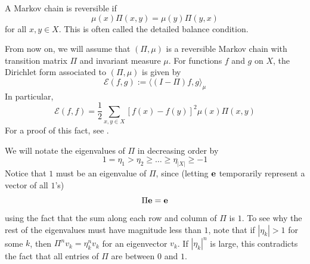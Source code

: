 \documentclass[12pt]{report}
\theoremstyle{definition}
\begin{document}
A Markov chain is reversible if 
$$
\mu(x)\Pi(x,y)=\mu(y)\Pi(y,x)$$ for all $x,y\in X$.  This is often called the detailed balance condition.  

From now on, we will assume that $(\Pi, \mu)$ is a reversible Markov chain with transition matrix $\Pi$ and invariant measure $\mu$.  For functions $f$ and $g$ on $X$, the Dirichlet form associated to $(\Pi,\mu)$ is given by 
$$
\mathcal{E}(f,g):=\langle (I-\Pi)f,g\rangle_{\mu}
$$
In particular, 
$$
\mathcal{E}(f,f)=\frac{1}{2}\sum_{x,y\in X}[f(x)-f(y)]^2\mu(x)\Pi(x,y)
$$
For a proof of this fact, see \cite{LPW}.

We will notate the eigenvalues of $\Pi$ in decreasing order by 
$$
1=\eta_1>\eta_2\geq\dots\geq \eta_{|X|}\geq -1
$$
Notice that $1$ must be an eigenvalue of $\Pi$, since (letting $\bf{e}$ temporarily represent a vector of all $1$'s) 
$$
\Pi\bf{e}=\bf{e}
$$
using the fact that the sum along each row and column of $\Pi$ is $1$.  To see why the rest of the eigenvalues must have magnitude less than $1$, note that if $|\eta_k|>1$ for some $k$, then $\Pi^nv_k=\eta_k^n v_k$ for an eigenvector $v_k$.  If $|\eta_k|^n$ is large, this contradicts the fact that all entries of $\Pi$ are between $0$ and $1$.  
\end{document}
